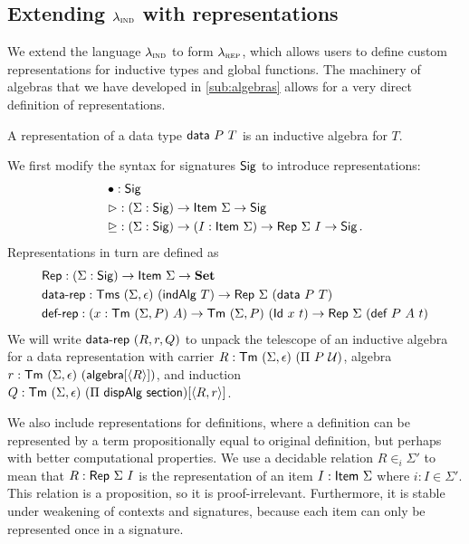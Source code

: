 \subsection{Extending $\lambda_{\textsc{ind}}$ with representations} \label{sub:lambdarep}

We extend the language $\lambda_{\textsc{ind}}$ to form $\lambda_{\textsc{rep}}$, which allows users to
define custom representations for inductive types and global functions. The
machinery of algebras that we have developed in \cref{sub:algebras} allows for a
very direct definition of representations.

\begin{definition}
	A representation of a data type $\textsf{data}\ P\ T$ is an inductive algebra for $T$.
\end{definition}

We first modify the syntax for signatures $\textsf{Sig}$ to introduce representations:
\begin{align*}
	 & \bullet : \Sig \\
	 & \rhd : (\Sigma : \Sig) \to \Item\ \Sigma \to \Sig \\
	 & \unrhd : (\Sigma : \Sig) \to (I : \Item\ \Sigma) \to \Rep\ \Sigma\ I \to \Sig \,.
\end{align*}
Representations in turn are defined as
\begin{align*}
& \Rep : (\Sigma : \Sig) \to \Item\ \Sigma \to \Set \\
& \mta{data-rep} : \Tms\ (\Sigma, \epsilon)\ (\mta{indAlg}\ T) \to \Rep\ \Sigma\ (\mta{data}\ P\ T) \\
& \mta{def-rep} : (x : \Tm\ (\Sigma, P)\ A) \to \Tm\ (\Sigma, P)\ (\mta{Id}\ x\ t) \to \Rep\ \Sigma\ (\mta{def}\ P\ A\ t)
\end{align*}
We will write $\textsf{data-rep}\ (R, r, Q)$ to unpack the telescope of an
inductive algebra for a data representation with carrier $R : \textsf{Tm}\ (\Sigma,
\epsilon)\ (\Pi\ P\ \mathcal{U})$, algebra $r : \textsf{Tm}\ (\Sigma, \epsilon)\
(\textsf{algebra}[\langle R\rangle])$, and induction $Q : \textsf{Tm}\ (\Sigma, \epsilon)\ (\Pi\
\textsf{dispAlg}\ \textsf{section})[\langle R, r\rangle]$.

We also include representations for definitions, where a definition can be
represented by a term propositionally equal to original definition, but perhaps
with better computational properties.
We use a decidable relation $R \in_i \Sigma'$ to mean that $R :
\textsf{Rep}\ \Sigma\ I$ is the representation of an item $I : \textsf{Item}\ \Sigma$
where $i : I \in \Sigma'$.
This relation is a proposition, so it is proof-irrelevant. Furthermore, it is stable under
weakening of contexts and signatures, because each item can only be represented once in a signature.



